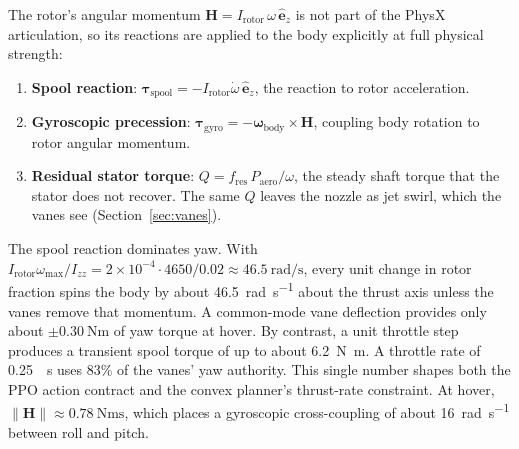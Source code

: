\documentclass[conference]{IEEEtran}
\begin{document}
The rotor's angular momentum $\mathbf{H} = I_{\text{rotor}}\,\omega\,\hat{\mathbf{e}}_z$ is not part of the PhysX articulation, so its reactions are applied to the body explicitly at full physical strength:
\begin{enumerate}
    \item \textbf{Spool reaction}: $\boldsymbol{\tau}_{\text{spool}} = -I_{\text{rotor}} \dot{\omega}\, \hat{\mathbf{e}}_z$, the reaction to rotor acceleration.
    \item \textbf{Gyroscopic precession}: $\boldsymbol{\tau}_{\text{gyro}} = -\boldsymbol{\omega}_{\text{body}} \times \mathbf{H}$, coupling body rotation to rotor angular momentum.
    \item \textbf{Residual stator torque}: $Q = f_{\text{res}}\,P_{\text{aero}}/\omega$, the steady shaft torque that the stator does not recover. The same $Q$ leaves the nozzle as jet swirl, which the vanes see (Section~\ref{sec:vanes}).
\end{enumerate}

The spool reaction dominates yaw. With $I_{\text{rotor}}\omega_{\max}/I_{zz} = 2\times10^{-4}\cdot 4650/0.02 \approx \SI{46.5}{\radian\per\second}$, every unit change in rotor fraction spins the body by about \SI{46.5}{\radian\per\second} about the thrust axis unless the vanes remove that momentum. A common-mode vane deflection provides only about $\pm\SI{0.30}{\newton\metre}$ of yaw torque at hover. By contrast, a unit throttle step produces a transient spool torque of up to about \SI{6.2}{\newton\metre}. A throttle rate of \SI{0.25}{\per\second} uses 83\% of the vanes' yaw authority. This single number shapes both the PPO action contract and the convex planner's thrust-rate constraint. At hover, $\|\mathbf{H}\| \approx \SI{0.78}{\newton\metre\second}$, which places a gyroscopic cross-coupling of about \SI{16}{\radian\per\second} between roll and pitch.
\end{document}
